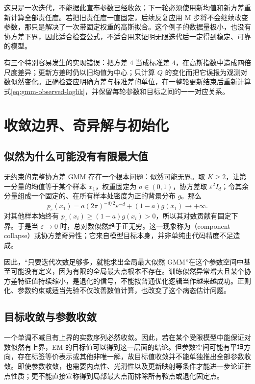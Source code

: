 \documentclass[UTF8]{ctexart}
\begin{document}
这只是一次迭代，不能据此宣布参数已经收敛；下一轮必须使用新均值和新方差重新计算全部责任度。若把旧责任度一直固定，后续反复应用 M 步将不会继续改变参数，那只是解决了一次带固定权重的高斯拟合。这个例子的数据量极小，也没有协方差下界，因此适合检查公式，不适合用来证明无限迭代后一定得到稳定、可靠的模型。

有三个特别容易发生的实现错误：把方差 $4$ 当成标准差 $4$，在高斯指数中造成四倍尺度差异；更新方差时仍以旧均值为中心；只计算 $Q$ 的变化而把它误报为观测对数似然变化。正确检查应明确方差与标准差的单位，在一整轮更新结束后重新计算式\eqref{eq:gmm-observed-loglik}，并保留每轮参数和目标之间的一一对应关系。

\section{收敛边界、奇异解与初始化}
\label{sec:gmm-pathologies}

\subsection{似然为什么可能没有有限最大值}
无约束的完整协方差 GMM 存在一个根本问题：似然可能无界。取 $K\geq2$，让第一分量的均值等于某个样本 $x_1$，权重固定为 $a\in(0,1)$，协方差取 $\varepsilon^2I_d$；令其余分量组成一个固定的、在所有样本处密度为正的背景分布 $g$。那么
\[
p_\varepsilon(x_1)=a(2\pi)^{-d/2}\varepsilon^{-d}+(1-a)g(x_1)\longrightarrow+\infty.
\]
对其他样本始终有 $p_\varepsilon(x_i)\geq(1-a)g(x_i)>0$，所以其对数贡献有固定下界。于是当 $\varepsilon\to0$ 时，总对数似然趋于正无穷。这一现象称为（component collapse）或协方差奇异性；它来自模型目标本身，并非单纯由代码精度不足造成。

因此，“只要迭代次数足够多，就能求出全局最大似然 GMM”在这个参数空间中甚至可能没有定义，因为有限的全局最大点根本不存在。训练似然异常增大且某个协方差特征值持续缩小，是退化的信号，不能按普通优化逻辑当作越来越成功。正则化、参数约束或适当先验不仅改善数值计算，也改变了这个病态估计问题。

\subsection{目标收敛与参数收敛}
一个单调不减且有上界的实数序列必然收敛。因此，若在某个受限模型中能保证对数似然有上界，EM 的目标值可以得到这一层面的结论。但参数空间可能有平坦方向，存在标签等价表示或其他非唯一解，故目标值收敛并不能单独推出全部参数收敛。即使参数收敛，也需要内点性、光滑性以及更新映射等条件才能进一步论证驻点性质；更不能直接宣称得到局部最大点而排除所有鞍点或退化固定点。
\end{document}

